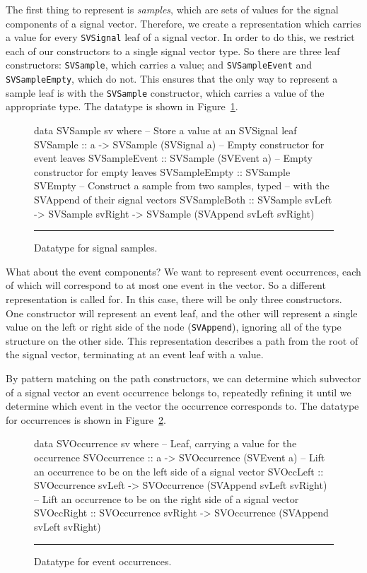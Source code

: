 The first thing to represent is {\em samples}, which are sets of values for
the signal components of a signal vector. Therefore, we create a representation
which carries a value for every {\tt SVSignal} leaf of a signal vector. In order
to do this, we restrict each of our constructors to a single signal vector type.
So there are three leaf constructors: {\tt SVSample}, which carries a value; and
{\tt SVSampleEvent} and {\tt SVSampleEmpty}, which do not. This ensures that the
only way to represent a sample leaf is with the {\tt SVSample} constructor,
which carries a value of the appropriate type. The datatype is shown in
Figure~\ref{figure:signal_sample_datatype}.

\begin{figure}
\begin{code}
data SVSample sv where
  -- Store a value at an SVSignal leaf
  SVSample      ::    a
                   -> SVSample (SVSignal a)
  -- Empty constructor for event leaves
  SVSampleEvent ::    SVSample (SVEvent a)
  -- Empty constructor for empty leaves
  SVSampleEmpty ::    SVSample SVEmpty
  -- Construct a sample from two samples, typed
  --  with the SVAppend of their signal vectors
  SVSampleBoth  ::    SVSample svLeft
                   -> SVSample svRight
                   -> SVSample (SVAppend svLeft svRight)
\end{code}
\hrule
\caption{Datatype for signal samples.}
\label{figure:signal_sample_datatype}
\end{figure}

What about the event components? We want to represent event occurrences,
each of which will correspond to at most one event in the vector. So a different
representation is called for. In this case, there will be only three
constructors. One constructor will represent an event leaf, and the other will
represent a single value on the left or right side of the node ({\tt SVAppend}),
ignoring all of the type structure on the other side. This representation
describes a path from the root of the signal vector, terminating at an event
leaf with a value.

By pattern matching on the path constructors, we can determine which subvector
of a signal vector an event occurrence belongs to, repeatedly refining it until
we determine which event in the vector the occurrence corresponds to. The
datatype for occurrences is shown in Figure~\ref{figure:event_occurrence_datatype}.

\begin{figure}
\begin{code}
data SVOccurrence sv where
  -- Leaf, carrying a value for the occurrence
  SVOccurrence ::    a
                  -> SVOccurrence (SVEvent a)
  -- Lift an occurrence to be on the left side of a signal vector
  SVOccLeft    ::    SVOccurrence svLeft
                  -> SVOccurrence (SVAppend svLeft svRight)
  -- Lift an occurrence to be on the right side of a signal vector
  SVOccRight   ::    SVOccurrence svRight 
                  -> SVOccurrence (SVAppend svLeft svRight)
\end{code}
\hrule
\caption{Datatype for event occurrences.}
\label{figure:event_occurrence_datatype}
\end{figure}

